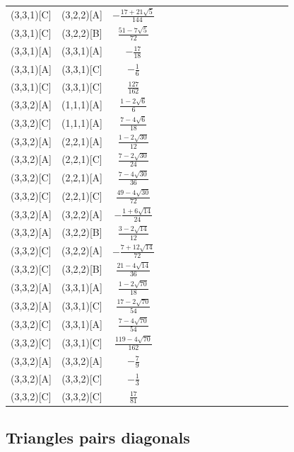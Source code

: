 \documentclass[11pt]{article}
\begin{document}
\begin{longtable}{ | p{2cm}| *{15}{c|} }
(3,3,1)[C] & (3,2,2)[A] & $-\frac{17+21\sqrt{5}}{144}$\\ %
(3,3,1)[C] & (3,2,2)[B] & $\frac{51-7\sqrt{5}}{72}$\\ %
(3,3,1)[A] & (3,3,1)[A] & $-\frac{17}{18}$\\ %
(3,3,1)[A] & (3,3,1)[C] & $-\frac{1}{6}$\\ %
(3,3,1)[C] & (3,3,1)[C] & $\frac{127}{162}$\\ %
(3,3,2)[A] & (1,1,1)[A] & $\frac{1-2\sqrt{6}}{6}$\\ %
(3,3,2)[C] & (1,1,1)[A] & $\frac{7-4\sqrt{6}}{18}$\\ %
(3,3,2)[A] & (2,2,1)[A] & $\frac{1-2\sqrt{30}}{12}$\\ %
(3,3,2)[A] & (2,2,1)[C] & $\frac{7-2\sqrt{30}}{24}$\\ %
(3,3,2)[C] & (2,2,1)[A] & $\frac{7-4\sqrt{30}}{36}$\\ %
(3,3,2)[C] & (2,2,1)[C] & $\frac{49-4\sqrt{30}}{72}$\\ %
(3,3,2)[A] & (3,2,2)[A] & $-\frac{1+6\sqrt{14}}{24}$\\ %
(3,3,2)[A] & (3,2,2)[B] & $\frac{3-2\sqrt{14}}{12}$\\ %
(3,3,2)[C] & (3,2,2)[A] & $-\frac{7+12\sqrt{14}}{72}$\\ %
(3,3,2)[C] & (3,2,2)[B] & $\frac{21-4\sqrt{14}}{36}$\\ %
(3,3,2)[A] & (3,3,1)[A] & $\frac{1-2\sqrt{70}}{18}$\\ %
(3,3,2)[A] & (3,3,1)[C] & $\frac{17-2\sqrt{70}}{54}$\\ %
(3,3,2)[C] & (3,3,1)[A] & $\frac{7-4\sqrt{70}}{54}$\\ %
(3,3,2)[C] & (3,3,1)[C] & $\frac{119-4\sqrt{70}}{162}$\\ %
(3,3,2)[A] & (3,3,2)[A] & $-\frac{7}{9}$\\ %
(3,3,2)[A] & (3,3,2)[C] & $-\frac{1}{3}$\\ %
(3,3,2)[C] & (3,3,2)[C] & $\frac{17}{81}$\\ %
\end{longtable}





\subsection{Triangles pairs diagonals}
\end{document}
